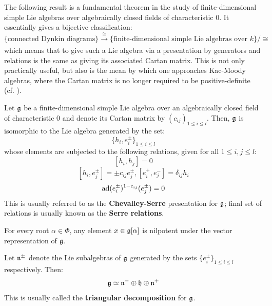             The following result is a fundamental theorem in the study of finite-dimensional simple Lie algebras over algebraically closed fields of characteristic $0$. It essentially gives a bijective classification:
                $$\{ \text{connected Dynkin diagrams} \} \xrightarrow[]{\cong} \{ \text{finite-dimensional simple Lie algebras over $k$} \}/\cong$$
            which means that to give such a Lie algebra via a presentation by generators and relations is the same as giving its associated Cartan matrix. This is not only practically useful, but also is the mean by which one approaches Kac-Moody algebras, where the Cartan matrix is no longer required to be positive-definite (cf. \cite[Chapters 1-5]{kac_infinite_dimensional_lie_algebras}). 
            \begin{theorem}
                Let $\mathfrak{g}$ be a finite-dimensional simple Lie algebra over an algebraically closed field of characteristic $0$ and denote its Cartan matrix by $(c_{ij})_{1 \leq i \leq l}$. Then, $\mathfrak{g}$ is isomorphic to the Lie algebra generated by the set:
                    $$\{h_i, e_i^{\pm}\}_{1 \leq i \leq l}$$
                whose elements are subjected to the following relations, given for all $1 \leq i, j \leq l$:
                    $$[h_i, h_j] = 0$$
                    $$[h_i, e_j^{\pm}] = \pm c_{ij} e_j^{\pm}, [e_i^+, e_j^-] = \delta_{ij} h_i$$
                    $$\mathrm{ad}(e_i^{\pm})^{1 - c_{ij}}(e_j^{\pm}) = 0$$
                This is usually referred to as the \textbf{Chevalley-Serre} presentation for $\mathfrak{g}$; final set of relations is usually known as the \textbf{Serre relations}.
            \end{theorem}
            \begin{corollary}
                For every root $\alpha \in \Phi$, any element $x \in \mathfrak{g}[\alpha]$ is nilpotent under the vector representation of $\mathfrak{g}$. 
            \end{corollary}
            \begin{corollary}
                Let $\mathfrak{n}^{\pm}$ denote the Lie subalgebras of $\mathfrak{g}$ generated by the sets $\{e_i^{\pm}\}_{1 \leq i \leq l}$ respectively. Then:
                    $$\mathfrak{g} \simeq \mathfrak{n}^- \oplus \mathfrak{h} \oplus \mathfrak{n}^+$$
                This is usually called the \textbf{triangular decomposition} for $\mathfrak{g}$. 
            \end{corollary}

